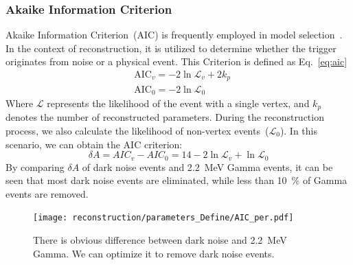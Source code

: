 \subsubsection{Akaike Information Criterion}
Akaike Information Criterion~(AIC) is frequently employed in model selection~\cite{AIC}. In the context of reconstruction, it is utilized to determine whether the trigger originates from noise or a physical event. This Criterion is defined as Eq.~\eqref{eq:aic}
\begin{equation}
	\begin{aligned}
		 & \text{AIC}_v = -2 \ln \mathcal{L}_v + 2k_p \\
		 & \text{AIC}_0 = -2 \ln \mathcal{L}_0
	\end{aligned}
	\label{eq:aic}
\end{equation}
Where $\mathcal{L}$ represents the likelihood of the event with a single vertex, and $k_p$ denotes the number of reconstructed parameters. During the reconstruction process, we also calculate the likelihood of non-vertex events~($\mathcal{L}_0$). In this scenario, we can obtain the AIC criterion:
\begin{equation}
	\delta A = AIC_v - AIC_0 = 14 - 2\ln \mathcal{L}_v + \ln \mathcal{L}_0
	\label{eq:daic}
\end{equation}
By comparing $\delta A$ of dark noise events and \SI{2.2}{MeV} Gamma events, it can be seen that most dark noise events are eliminated, while less than \SI{10}{\%} of Gamma events are removed.
\begin{figure}
	\centering
	\texttt{[image: reconstruction/parameters\_Define/AIC\_per.pdf]}
	\caption{There is obvious difference between dark noise and
		\SI{2.2}{MeV} Gamma. We can optimize it to remove dark noise events.}
\end{figure}


